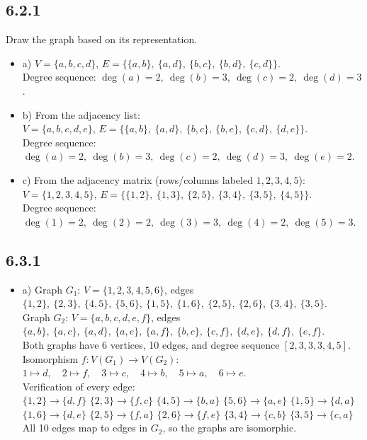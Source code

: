 \documentclass{article}
\begin{document}
\subsection*{6.2.1}
Draw the graph based on its representation.
\begin{itemize}
    \item a) $V = \{a,b,c,d\}$, $E = \{\{a,b\},\ \{a,d\},\ \{b,c\},\ \{b,d\},\ \{c,d\}\}$.\\
    Degree sequence: $\deg(a)=2,\ \deg(b)=3,\ \deg(c)=2,\ \deg(d)=3$.

    \item b) From the adjacency list:\\
    $V = \{a,b,c,d,e\}$, $E = \{\{a,b\},\ \{a,d\},\ \{b,c\},\ \{b,e\},\ \{c,d\},\ \{d,e\}\}$.\\
    Degree sequence: $\deg(a)=2,\ \deg(b)=3,\ \deg(c)=2,\ \deg(d)=3,\ \deg(e)=2$.

    \item c) From the adjacency matrix (rows/columns labeled $1,2,3,4,5$):\\
    $V = \{1,2,3,4,5\}$, $E = \{\{1,2\},\ \{1,3\},\ \{2,5\},\ \{3,4\},\ \{3,5\},\ \{4,5\}\}$.\\
    Degree sequence: $\deg(1)=2,\ \deg(2)=2,\ \deg(3)=3,\ \deg(4)=2,\ \deg(5)=3$.
\end{itemize}

\subsection*{6.3.1}
\begin{itemize}
    \item a) Graph $G_1$: $V = \{1,2,3,4,5,6\}$, edges $\{1,2\},\ \{2,3\},\ \{4,5\},\ \{5,6\},\ \{1,5\},\ \{1,6\},\ \{2,5\},\ \{2,6\},\ \{3,4\},\ \{3,5\}$.\\
    Graph $G_2$: $V = \{a,b,c,d,e,f\}$, edges $\{a,b\},\ \{a,c\},\ \{a,d\},\ \{a,e\},\ \{a,f\},\ \{b,c\},\ \{c,f\},\ \{d,e\},\ \{d,f\},\ \{e,f\}$.\\[4pt]
    Both graphs have 6 vertices, 10 edges, and degree sequence $[2,3,3,3,4,5]$.\\[4pt]
    Isomorphism $f\colon V(G_1) \to V(G_2)$:\\
    $1 \mapsto d,\quad 2 \mapsto f,\quad 3 \mapsto c,\quad 4 \mapsto b,\quad 5 \mapsto a,\quad 6 \mapsto e$.\\[4pt]
    Verification of every edge:\\
    $\{1,2\} \to \{d,f\}$ \checkmark\quad
    $\{2,3\} \to \{f,c\}$ \checkmark\quad
    $\{4,5\} \to \{b,a\}$ \checkmark\quad
    $\{5,6\} \to \{a,e\}$ \checkmark\quad
    $\{1,5\} \to \{d,a\}$ \checkmark\\
    $\{1,6\} \to \{d,e\}$ \checkmark\quad
    $\{2,5\} \to \{f,a\}$ \checkmark\quad
    $\{2,6\} \to \{f,e\}$ \checkmark\quad
    $\{3,4\} \to \{c,b\}$ \checkmark\quad
    $\{3,5\} \to \{c,a\}$ \checkmark\\
    All 10 edges map to edges in $G_2$, so the graphs are isomorphic.
\end{itemize}
\end{document}
